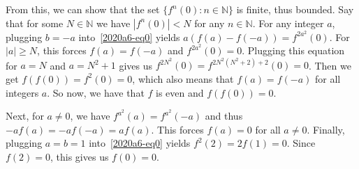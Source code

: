 \documentclass{article}
\newcommand{\N}{\mathbb{N}}
\begin{document}
From this, we can show that the set $\{f^n(0) : n \in \N\}$ is finite, thus bounded.
Say that for some $N \in \N$ we have $|f^n(0)| < N$ for any $n \in \N$.
For any integer $a$, plugging $b = -a$ into~\eqref{2020a6-eq0} yields $a (f(a) - f(-a)) = f^{2a^2}(0)$.
For $|a| \geq N$, this forces $f(a) = f(-a)$ and $f^{2a^2}(0) = 0$.
Plugging this equation for $a = N$ and $a = N^2 + 1$ gives us $f^{2N^2}(0) = f^{2 N^2 (N^2 + 2) + 2}(0) = 0$.
Then we get $f(f(0)) = f^2(0) = 0$, which also means that $f(a) = f(-a)$ for all integers $a$.
So now, we have that $f$ is even and $f(f(0)) = 0$.

Next, for $a \neq 0$, we have $f^{a^2}(a) = f^{a^2}(-a)$ and thus $-a f(a) = -a f(-a) = a f(a)$.
This forces $f(a) = 0$ for all $a \neq 0$.
Finally, plugging $a = b = 1$ into~\eqref{2020a6-eq0} yields $f^2(2) = 2 f(1) = 0$.
Since $f(2) = 0$, this gives us $f(0) = 0$.
\end{document}
